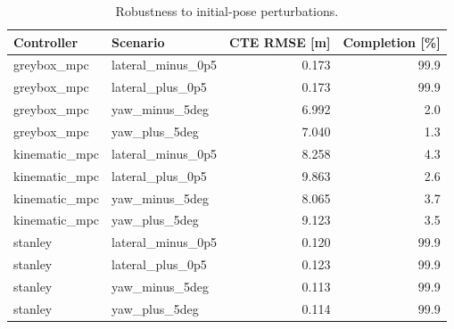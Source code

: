 \begin{table}[t]
\centering
\caption{Robustness to initial-pose perturbations.}
\label{tab:robustness}
\begin{tabular}{llrr}
\hline
Controller & Scenario & CTE RMSE [m] & Completion [\%] \\
\hline
greybox\_mpc & lateral\_minus\_0p5 & 0.173 & 99.9 \\
greybox\_mpc & lateral\_plus\_0p5 & 0.173 & 99.9 \\
greybox\_mpc & yaw\_minus\_5deg & 6.992 & 2.0 \\
greybox\_mpc & yaw\_plus\_5deg & 7.040 & 1.3 \\
kinematic\_mpc & lateral\_minus\_0p5 & 8.258 & 4.3 \\
kinematic\_mpc & lateral\_plus\_0p5 & 9.863 & 2.6 \\
kinematic\_mpc & yaw\_minus\_5deg & 8.065 & 3.7 \\
kinematic\_mpc & yaw\_plus\_5deg & 9.123 & 3.5 \\
stanley & lateral\_minus\_0p5 & 0.120 & 99.9 \\
stanley & lateral\_plus\_0p5 & 0.123 & 99.9 \\
stanley & yaw\_minus\_5deg & 0.113 & 99.9 \\
stanley & yaw\_plus\_5deg & 0.114 & 99.9 \\
\hline
\end{tabular}
\end{table}
